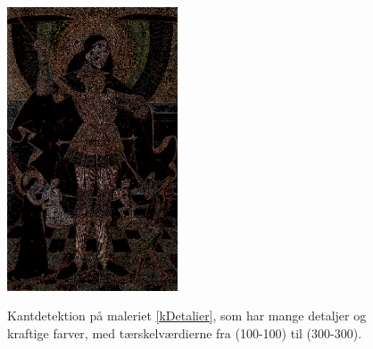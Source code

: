 \begin{figure}[p]
{        \includegraphics[angle=0,width=0.45\textwidth]{afsnit/afprovning/billeder/thressholds/krafitige_farver/krafite_detalier/1_iteration/200-200.png}
        \label{200-200}}
    \hspace{1em}
    \caption{Kantdetektion på maleriet \ref{kDetalier}, som har mange
	detaljer og kraftige farver, med tærskelværdierne fra (100-100) til
	(300-300).}
	\label{allesammen1}
\end{figure}

\clearpage

